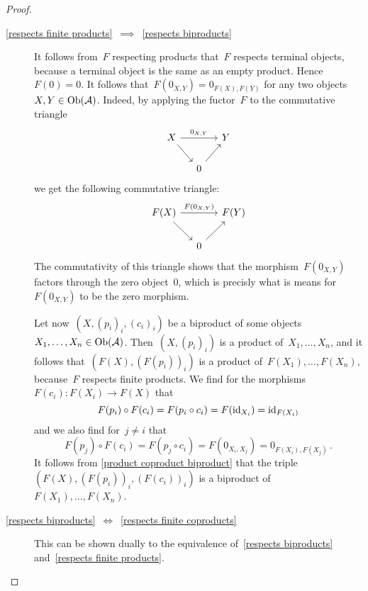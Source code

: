 \begin{proof}
\begin{enumerate}
\begin{description}
        \item[\ref*{respects finite products}~$\implies$~\ref*{respects biproducts}]
          It follows from~$F$ respecting products that~$F$ respects terminal objects, because a terminal object is the same as an empty product.
          Hence~$F(0) = 0$.
          It follows that~$F(0_{X,Y}) = 0_{F(X), F(Y)}$ for any two objects~$X, Y \in \operatorname{Ob}(\mathcal{A})$.
          Indeed, by applying the fuctor~$F$ to the commutative triangle
          \[
            \begin{tikzcd}[column sep = small]
                X
                \arrow{rr}[above]{0_{X,Y}}
                \arrow{dr}
              & {}
              & Y
              \\
                {}
              & 0
                \arrow{ur}
              & {}
            \end{tikzcd}
          \]
          we get the following commutative triangle:
          \[
            \begin{tikzcd}[column sep = small]
                F(X)
                \arrow{rr}[above]{F(0_{X,Y})}
                \arrow{dr}
              & {}
              & F(Y)
              \\
                {}
              & 0
                \arrow{ur}
              & {}
            \end{tikzcd}
          \]
          The commutativity of this triangle shows that the morphism~$F(0_{X,Y})$ factors through the zero object~$0$, which is precisly what is means for~$F(0_{X,Y})$ to be the zero morphism.
          
          Let now~$(X, (p_i)_i, (c_i)_i)$ be a biproduct of some objects~$X_1, \dotsc, X_n \in \operatorname{Ob}(\mathcal{A})$.
          Then~$(X, (p_i)_i)$ is a product of~$X_1, \dotsc, X_n$, and it follows that~$(F(X), (F(p_i))_i)$ is a product of~$F(X_1), \dotsc, F(X_n)$, because~$F$ respects finite products.
          We find for the morphisms~$F(c_i) \colon F(X_i) \to F(X)$ that
          \[
              F(p_i) \circ F(c_i)
            = F(p_i \circ c_i)
            = F( \operatorname{id}_{X_i} )
            = \operatorname{id}_{F(X_i)}
          \]
          and we also find for~$j \neq i$ that
          \[
              F(p_j) \circ F(c_i)
            = F(p_j \circ c_i)
            = F(0_{X_i, X_j})
            = 0_{F(X_i), F(X_j)} \,.
          \]
          It follows from \cref{product coproduct biproduct} that the triple~$(F(X), (F(p_i))_i, (F(c_i))_i)$ is a biproduct of~$F(X_1), \dotsc, F(X_n)$.
          
        \item[\ref*{respects biproducts}~$\iff$~\ref*{respects finite coproducts}]
          This can be shown dually to the equivalence of~\ref*{respects biproducts} and~\ref*{respects finite products}.
        

\end{description}
\end{enumerate}
\end{proof}
